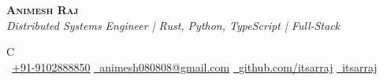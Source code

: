 \documentclass[a4paper,11pt]{article}
\begin{document}



\begin{center}
    \textbf{\Huge \scshape Animesh Raj} \\[0.4em]
    \textit{Distributed Systems Engineer | Rust, Python, TypeScript | Full-Stack} \\[0.4em]
    \small
    \begin{tabularx}{\linewidth}{C} \\
        {\raisebox{0.0\height}{\footnotesize \faPhone}\ \underline{+91-9102888850}} \hspace{4pt}
        \href{mailto:animesh080808@gmail.com}{\raisebox{0.0\height}{\footnotesize \faEnvelope}\ \underline{animesh080808@gmail.com}} \hspace{4pt}
        \href{https://github.com/itsarraj}{\raisebox{0.0\height}{\footnotesize \faGithub}\ \underline{github.com/itsarraj}} \hspace{4pt}
        \href{https://linkedin.com/in/itsarraj}{\raisebox{0.0\height}{\footnotesize \faLinkedin}\ \underline{itsarraj}} \hspace{4pt}
    \end{tabularx}
\end{center}

\vspace{-16pt}
\end{document}
